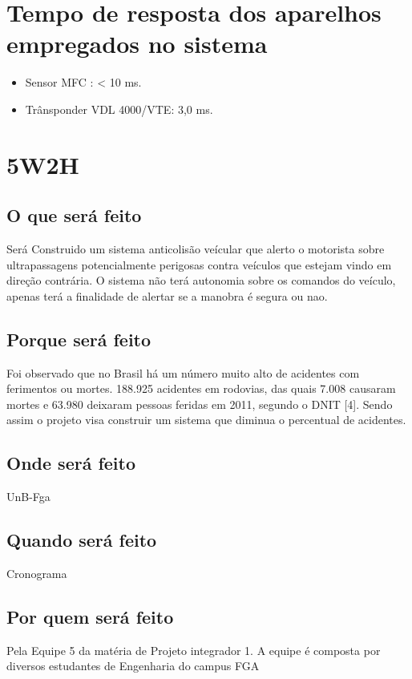 \section{Tempo de resposta dos aparelhos empregados no sistema}
\begin{itemize}
  \item Sensor MFC \cite{mfc} : < 10 ms.
  \item Trânsponder VDL 4000/VTE: 3,0 ms.
\end{itemize}

\section {5W2H}

\subsection{O que será feito}
Será Construido um sistema anticolisão veícular que alerto o motorista sobre ultrapassagens potencialmente perigosas contra veículos que estejam vindo em direção contrária. O sistema não terá autonomia sobre os comandos do veículo, apenas terá a finalidade de alertar se a manobra é segura ou nao.

\subsection{Porque será feito}
Foi observado que no Brasil há um número muito alto de acidentes com ferimentos ou mortes. 188.925 acidentes em rodovias, das quais 7.008 causaram mortes e 63.980 deixaram pessoas feridas em 2011, segundo o DNIT [4]. Sendo assim o projeto visa construir um sistema que diminua o percentual de acidentes.

\subsection{Onde será feito}
UnB-Fga

\subsection{Quando será feito}
Cronograma

\subsection{Por quem será feito}
Pela Equipe 5 da matéria de Projeto integrador 1. A equipe é composta por diversos estudantes de Engenharia do campus FGA

